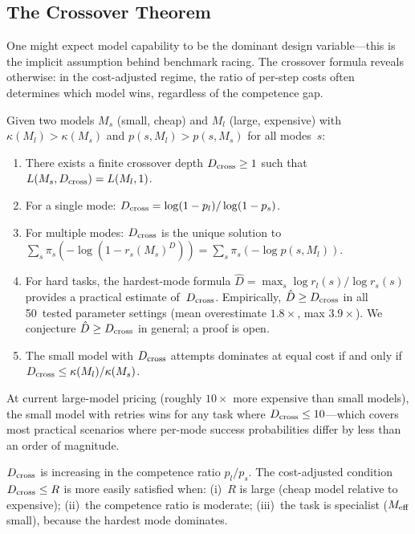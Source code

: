 \subsection{The Crossover Theorem}
\label{sec:crossover}

One might expect model capability to be the dominant design variable---this is the implicit assumption behind benchmark racing.
The crossover formula reveals otherwise: in the cost-adjusted regime, the ratio of per-step costs often determines which model wins, regardless of the competence gap.

\begin{theorem}
\label{thm:crossover}
Given two models $M_s$ (small, cheap) and $M_l$ (large, expensive) with $\kappa(M_l) > \kappa(M_s)$ and $p(s, M_l) > p(s, M_s)$ for all modes~$s$:
\begin{enumerate}[label=(\alph*)]
  \item There exists a finite crossover depth $D_{\mathrm{cross}} \ge 1$ such that $L(M_s, D_{\mathrm{cross}}) = L(M_l, 1)$.
  \item For a single mode: $D_{\mathrm{cross}} = \log(1 - p_l) / \log(1 - p_s)$.
  \item For multiple modes: $D_{\mathrm{cross}}$ is the unique solution to $\sum_s \pi_s (-\log(1 - r_s(M_s)^D)) = \sum_s \pi_s (-\log p(s, M_l))$.
  \item For hard tasks, the hardest-mode formula $\hat{D} = \max_s \log r_l(s) / \log r_s(s)$ provides a practical estimate of~$D_{\mathrm{cross}}$. Empirically, $\hat{D} \ge D_{\mathrm{cross}}$ in all 50~tested parameter settings (mean overestimate $1.8\times$, max $3.9\times$). We conjecture $\hat{D} \ge D_{\mathrm{cross}}$ in general; a proof is open.
  \item The small model with $D_{\mathrm{cross}}$ attempts dominates at equal cost if and only if $D_{\mathrm{cross}} \le \kappa(M_l) / \kappa(M_s)$.
\end{enumerate}
\end{theorem}

At current large-model pricing (roughly $10\times$ more expensive than small models), the small model with retries wins for any task where $D_{\mathrm{cross}} \le 10$---which covers most practical scenarios where per-mode success probabilities differ by less than an order of magnitude.

\begin{corollary}
\label{cor:crossover-statics}
$D_{\mathrm{cross}}$ is increasing in the competence ratio $p_l/p_s$.
The cost-adjusted condition $D_{\mathrm{cross}} \le R$ is more easily satisfied when: (i)~$R$ is large (cheap model relative to expensive); (ii)~the competence ratio is moderate; (iii)~the task is specialist ($M_{\mathrm{eff}}$ small), because the hardest mode dominates.
\end{corollary}

